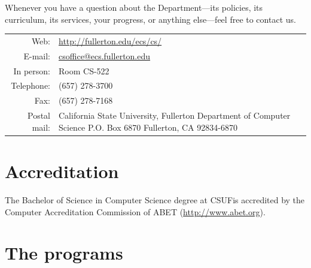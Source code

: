 \documentclass{book}
\newcommand{\campusname}{CSUF}
\begin{document}
Whenever you have a question about the Department---its policies, its curriculum, its services, your progress, or anything else---feel free to contact us.

\begin{tabular}{r p{6in}} %
  Web: & \url{http://fullerton.edu/ecs/cs/} \\ \index{website}
  E-mail: & \href{mailto:csoffice@ecs.fullerton.edu}{csoffice@ecs.fullerton.edu} \\ \index{e-mail}
  In person: & Room CS-522 \\ \index{department office}
  Telephone: & (657) 278-3700 \\ \index{phone number} \index{telephone number}
  Fax: & (657) 278-7168 \\ \index{fax number}
  Postal mail: & California State University, Fullerton \newline \index{postal address} \index{address}
Department of Computer Science \newline
P.O. Box 6870 \newline
Fullerton, CA 92834-6870
\end{tabular}

\section{Accreditation} 

The Bachelor of Science in Computer Science degree at \campusname is accredited by the Computer Accreditation Commission of ABET (\url{http://www.abet.org}).

\begin{center}
\end{center}

\section{The programs}
\end{document}

